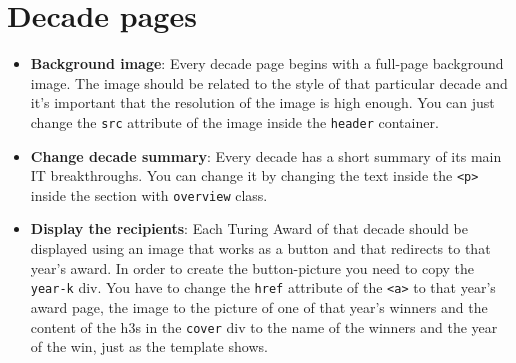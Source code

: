 \documentclass[a4paper,12pt]{article}
\newcommand{\<}{\textless}
\renewcommand{\>}{\textgreater}
\begin{document}
\section{Decade pages}
\begin{itemize}
 \item \textbf{Background image}: Every decade page begins with a full-page background image. The image should be related to the style of that particular decade and it's important that the resolution of the image is high enough. You can just change the \texttt{src} attribute of the image inside the \texttt{header} container.
 \item \textbf{Change decade summary}: Every decade has a short summary of its main IT breakthroughs. You can change it by changing the text inside the \texttt{<p>} inside the section with \texttt{overview} class.
 \item \textbf{Display the recipients}: Each Turing Award of that decade should be displayed using an image that works as a button and that redirects to that year's award. In order to create the button-picture you need to copy the \texttt{year-k} div. You have to change the \texttt{href} attribute of the \texttt{<a>} to that year's award page, the image to the picture of one of that year's winners and the content of the h3s in the \texttt{cover} div to the name of the winners and the year of the win, just as the template shows. 
\end{itemize}
\end{document}
